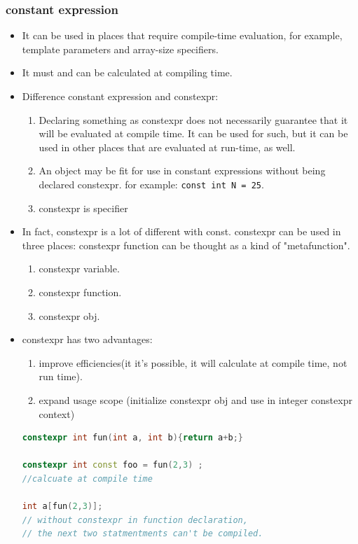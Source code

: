 \documentclass[a4paper,12pt,twoside]{book}
\begin{document}
\subsubsection{constant expression}
\begin{itemize}
	\item It can be used in places that require compile-time evaluation, for example, template parameters and array-size specifiers.
	
	\item It must and can be calculated at compiling time.
	
	\item Difference constant expression and constexpr:
	\begin{enumerate}
		\item Declaring something as constexpr does not necessarily guarantee that it will be evaluated at compile time. It can be used for such, but it can be used in other places that are evaluated at run-time, as well.
		
		\item An object may be fit for use in constant expressions without being declared constexpr. for example: \texttt{const int N = 25}.
		
		\item constexpr is specifier
	\end{enumerate}

\end{itemize}


\begin{itemize}
	\item In fact, constexpr is a lot of different with const. constexpr can be used in three places: constexpr function can be thought as a kind of "metafunction".
	\begin{enumerate}
		\item constexpr variable.
		\item constexpr function.
		\item constexpr obj.
	\end{enumerate}

	\item constexpr has two advantages:
\begin{enumerate}
	\item improve efficiencies(it it's possible, it will calculate at compile time, not run time). 
	\item expand usage scope (initialize constexpr obj and use in integer constexpr context)
\end{enumerate}
\begin{lstlisting}[frame=single, language=c++]
constexpr int fun(int a, int b){return a+b;}

constexpr int const foo = fun(2,3) ; 
//calcuate at compile time

int a[fun(2,3)];
// without constexpr in function declaration,
// the next two statmentments can't be compiled. 
\end{lstlisting}

\end{itemize}
\end{document}
